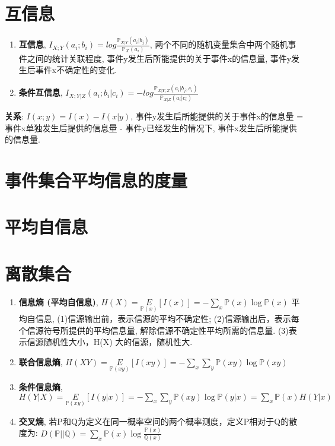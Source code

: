 \documentclass{article}
\newcommand{\env}[2]{\begin{#1}#2\end{#1}}
\newcommand{\defi}[2]{\textbf{#1}, #2}
\begin{document}
        \section{互信息}
            \env{enumerate}{
                \item \defi{互信息}{$I_{X;Y}(a_i;b_i) = log\frac{\mathbb P_{X|Y}(a_i|b_j)}{\mathbb P_X(a_i)}$, 两个不同的随机变量集合中两个随机事件之间的统计关联程度, 事件y发生后所能提供的关于事件x的信息量, 事件y发生后事件x不确定性的变化.}
                \item \defi{条件互信息}{$I_{X;Y|Z}(a_i;b_i|c_i) = -log\frac{\mathbb P_{X|Y,Z}(a_i|b_j, c_i)}{\mathbb P_{X|Z}(a_i|c_i)}$}
            }
            \textbf{关系}: $I(x;y) = I(x) - I(x|y)$, 事件y发生后所能提供的关于事件x的信息量 = 事件x单独发生后提供的信息量 - 事件y已经发生的情况下, 事件x发生后所能提供的信息量.
   
    \section{事件集合平均信息的度量}
        \section{平均自信息}
            \section{离散集合}
                \env{enumerate}{
                    \item \defi{信息熵 (平均自信息)}{$H(X) = \underset{\mathbb P(x)}{E}[I(x)] = -\sum\limits_x \mathbb P(x)\log \mathbb P(x)$ 平均自信息, (1)信源输出前，表示信源的平均不确定性; (2)信源输出后，表示每个信源符号所提供的平均信息量, 解除信源不确定性平均所需的信息量. (3)表示信源随机性大小，H(X) 大的信源，随机性大. }
                    \item \defi{联合信息熵}{$H(XY) = \underset{\mathbb P(xy)}{E}[I(xy)] = -\sum\limits_x \sum\limits_y \mathbb P(xy) \log \mathbb P(xy)$}
                    \item \defi{条件信息熵}{$H(Y|X) = \underset{\mathbb P(xy)}{E}[I(y|x)] = -\sum\limits_x \sum\limits_y \mathbb P(xy) \log \mathbb P(y|x) = \sum\limits_x \mathbb P(x) H(Y|x)$}
                    \item \defi{交叉熵}{若P和Q为定义在同一概率空间的两个概率测度，定义P相对于Q的散度为: $D(\mathbb P || \mathbb Q)=\sum\limits_x \mathbb P(x) \log \frac{\mathbb P(x)}{\mathbb Q(x)}$}
                }
                
\end{document}
